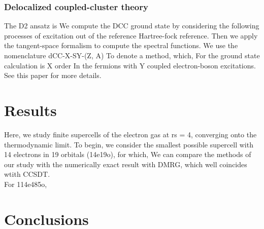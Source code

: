 \documentclass[letterpaper]{article}
\begin{document}
\subsubsection{Delocalized coupled-cluster theory}
The D2 ansatz is 
We compute the DCC ground state by considering the following processes of excitation out of the reference Hartree-fock reference. Then we apply the tangent-space formalism to compute the spectral functions. We use the nomenclature dCC-X-SY-(Z, A) To denote a method, which, For the ground state calculation is X order In the fermions with Y coupled electron-boson excitations. See this paper for more details. 
\section{Results}
Here, we study finite supercells of the electron gas at rs = 4, converging onto the thermodynamic limit. To begin, we consider the smallest possible supercell with 14 electrons in 19 orbitals (14e19o), for which, We can compare the methods of our study with  the numerically exact result with DMRG, which well coincides wtith CCSDT.\\
For 114e485o, 
\section{Conclusions}






\newpage

\end{document}
